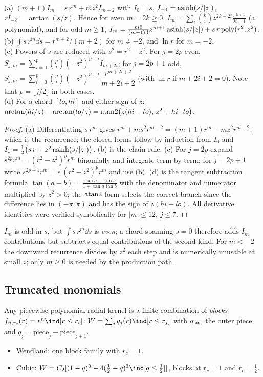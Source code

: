 \begin{proposition}[Primitives]\label{prop:primitives}
(a) $(m+1)I_m=s\,r^m+m z^2I_{m-2}$ with $I_0=s$, $I_{-1}=\operatorname{asinh}(s/|z|)$, $zI_{-2}=\arctan(s/z)$.
Hence for even $m=2k\ge0$, $I_m=\sum_i\binom ki z^{2k-2i}\frac{s^{2i+1}}{2i+1}$ (a polynomial), and for odd $m\ge1$,
$I_m=\frac{m!!}{(m+1)!!}z^{m+1}\operatorname{asinh}(s/|z|)+s\,r\,\mathrm{poly}(r^2,z^2)$.\\
(b) $\int s\,r^m\dd s=r^{m+2}/(m+2)$ for $m\neq-2$, and $\ln r$ for $m=-2$.\\
(c) Powers of $s$ are reduced with $s^2=r^2-z^2$. For $j=2p$ even,
$S_{j,m}=\sum_{i=0}^{p}\binom pi(-z^2)^{p-i}I_{m+2i}$; for $j=2p+1$ odd,
$S_{j,m}=\sum_{i=0}^{p}\binom pi(-z^2)^{p-i}\,\dfrac{r^{m+2i+2}}{m+2i+2}$ (with $\ln r$ if $m+2i+2=0$). Note that $p=\lfloor j/2\rfloor$ in both cases.\\
(d) For a chord $[lo,hi]$ and either sign of $z$:
$\arctan(hi/z)-\arctan(lo/z)=\operatorname{atan2}\!\big(z(hi-lo),\,z^2+hi\cdot lo\big)$. 
\end{proposition}
\begin{proof}
(a) Differentiating $s\,r^m$ gives $r^m+m s^2r^{m-2}=(m+1)r^m-mz^2r^{m-2}$, which is the recurrence; the closed forms follow by
induction from $I_0$ and $I_{1}=\frac12\big(s\,r+z^2\operatorname{asinh}(s/|z|)\big)$. (b) is the chain rule. (c) For $j=2p$ expand
$s^{2p}r^m=(r^2-z^2)^pr^m$ binomially and integrate term by term; for $j=2p+1$ write $s^{2p+1}r^m=s\,(r^2-z^2)^p r^m$ and use (b).
(d) is the tangent subtraction formula $\tan(a-b)=\frac{\tan a-\tan b}{1+\tan a\tan b}$ with the denominator and numerator multiplied
by $z^2>0$; the $\operatorname{atan2}$ form selects the correct branch since the difference lies in $(-\pi,\pi)$ and has the sign of $z(hi-lo)$.
All derivative identities were verified symbolically for $|m|\le12$, $j\le7$.
\end{proof}
\begin{remark}
$I_m$ is odd in $s$, but $\int s\,r^m\dd s$ is \emph{even}; a chord spanning $s=0$ therefore adds $I_m$ contributions but
subtracts equal contributions of the second kind. For $m<-2$ the downward recurrence divides by $z^2$ each step and is numerically
unusable at small $z$; only $m\ge0$ is needed by the production path.
\end{remark}

\subsection{Truncated monomials}
Any piecewise-polynomial radial kernel is a finite combination of \emph{blocks} $f_{n,r_c}(r)=r^n\ind[r\le r_c]$:
$W=\sum_jq_j(r)\ind[r\le r_j]$ with $q_{\rm last}$ the outer piece and $q_j=\text{piece}_j-\text{piece}_{j+1}$.
\begin{itemize}
\item Wendland: one block family with $r_c=1$.
\item Cubic: $W=C_2[(1-q)^3-4(\tfrac12-q)^3\ind[q\le\frac12]]$, blocks at $r_c=1$ and $r_c=\tfrac12$.
\end{itemize}

